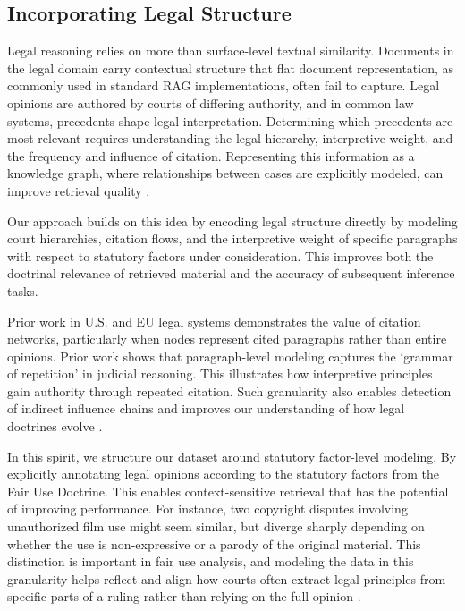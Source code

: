 \subsection{Incorporating Legal Structure}

Legal reasoning relies on more than surface-level textual similarity. Documents in the legal domain carry contextual structure that flat document representation, as commonly used in standard RAG implementations, often fail to capture. Legal opinions are authored by courts of differing authority, and in common law systems, precedents shape legal interpretation. Determining which precedents are most relevant requires understanding the legal hierarchy, interpretive weight, and the frequency and influence of citation. Representing this information as a knowledge graph, where relationships between cases are explicitly modeled, can improve retrieval quality \cite{07a_KGRAG, 07b_GraphRAG}.

Our approach builds on this idea by encoding legal structure directly by modeling court hierarchies, citation flows, and the interpretive weight of specific paragraphs with respect to statutory factors under consideration. This improves both the doctrinal relevance of retrieved material and the accuracy of subsequent inference tasks.

Prior work in U.S. and EU legal systems demonstrates the value of citation networks, particularly when nodes represent cited paragraphs rather than entire opinions. Prior work shows that paragraph-level modeling captures the `grammar of repetition' in judicial reasoning. This illustrates how interpretive principles gain authority through repeated citation. Such granularity also enables detection of indirect influence chains and improves our understanding of how legal doctrines evolve \cite{32_LegalCitationNetwork}.

In this spirit, we structure our dataset around statutory factor-level modeling. By explicitly annotating legal opinions according to the statutory factors from the Fair Use Doctrine. This enables context-sensitive retrieval that has the potential of improving performance. For instance, two copyright disputes involving unauthorized film use might seem similar, but diverge sharply depending on whether the use is non-expressive or a parody of the original material. This distinction is important in fair use analysis, and modeling the data in this granularity helps reflect and align how courts often extract legal principles from specific parts of a ruling rather than relying on the full opinion \cite{32_LegalCitationNetwork}.

